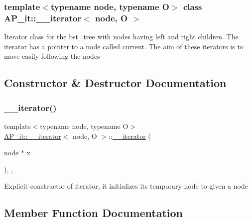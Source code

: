 \subsubsection*{template$<$typename node, typename O$>$\newline
class A\+P\+\_\+it\+::\+\_\+\+\_\+iterator$<$ node, O $>$}

Iterator class for the bst\+\_\+tree with nodes having left and right children. The iterator has a pointer to a node called current. The aim of these iterators is to move easily following the nodes 

\subsection{Constructor \& Destructor Documentation}
\mbox{\label{classAP__it_1_1____iterator_a7286a573bdc1fa300c664c316564c1a2}} 
\subsubsection{\texorpdfstring{\+\_\+\+\_\+iterator()}{\_\_iterator()}}
{\footnotesize\ttfamily template$<$typename node, typename O$>$ \\
\hyperlink{classAP__it_1_1____iterator}{A\+P\+\_\+it\+::\+\_\+\+\_\+iterator}$<$ node, O $>$\+::\hyperlink{classAP__it_1_1____iterator}{\+\_\+\+\_\+iterator} (\begin{DoxyParamCaption}\item[{node $\ast$}]{x }\end{DoxyParamCaption})\hspace{0.3cm}{\ttfamily [inline]}, {\ttfamily [explicit]}, {\ttfamily [noexcept]}}

Explicit constructor of iterator, it initializes its temporary node to given a node 

\subsection{Member Function Documentation}
\mbox{\label{classAP__it_1_1____iterator_a8bbe7fd8bc25d7f80eecdec977272828}} 
